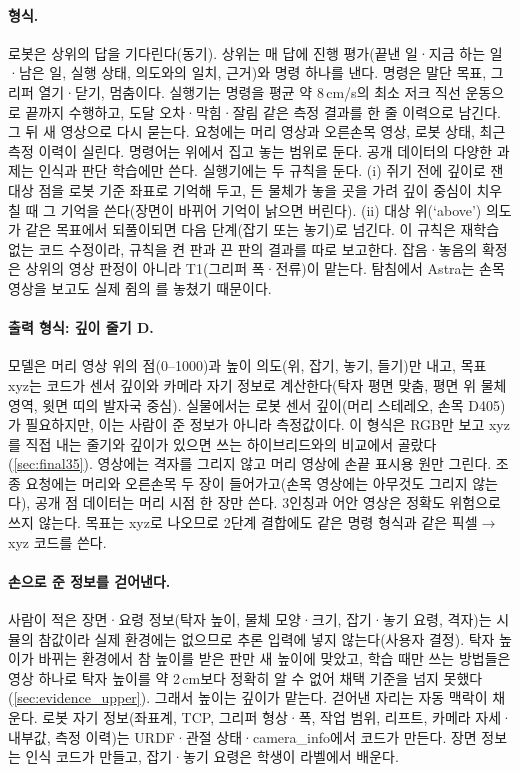 \paragraph{형식.} 로봇은 상위의 답을 기다린다(동기). 상위는 매 답에 진행 평가(끝낸 일·지금 하는 일·남은 일, 실행 상태, 의도와의 일치, 근거)와 명령 하나를 낸다. 명령은 말단 목표, 그리퍼 열기·닫기, 멈춤이다. 실행기는 명령을 평균 약 8\,cm/s의 최소 저크 직선 운동으로 끝까지 수행하고, 도달 오차·막힘·잘림 같은 측정 결과를 한 줄 이력으로 남긴다. 그 뒤 새 영상으로 다시 묻는다. 요청에는 머리 영상과 오른손목 영상, 로봇 상태, 최근 측정 이력이 실린다. 명령어는 위에서 집고 놓는 범위로 둔다. 공개 데이터의 다양한 과제는 인식과 판단 학습에만 쓴다. 실행기에는 두 규칙을 둔다. (i) 쥐기 전에 깊이로 잰 대상 점을 로봇 기준 좌표로 기억해 두고, 든 물체가 놓을 곳을 가려 깊이 중심이 치우칠 때 그 기억을 쓴다(장면이 바뀌어 기억이 낡으면 버린다). (ii) 대상 위(`above') 의도가 같은 목표에서 되풀이되면 다음 단계(잡기 또는 놓기)로 넘긴다. 이 규칙은 재학습 없는 코드 수정이라, 규칙을 켠 판과 끈 판의 결과를 따로 보고한다. 잡음·놓음의 확정은 상위의 영상 판정이 아니라 T1(그리퍼 폭·전류)이 맡는다. 탐침에서 Astra는 손목 영상을 보고도 실제 쥠의 를 놓쳤기 때문이다.

\paragraph{출력 형식: 깊이 줄기 D.} 모델은 머리 영상 위의 점(0--1000)과 높이 의도(위, 잡기, 놓기, 들기)만 내고, 목표 xyz는 코드가 센서 깊이와 카메라 자기 정보로 계산한다(탁자 평면 맞춤, 평면 위 물체 영역, 윗면 띠의 발자국 중심). 실물에서는 로봇 센서 깊이(머리 스테레오, 손목 D405)가 필요하지만, 이는 사람이 준 정보가 아니라 측정값이다. 이 형식은 RGB만 보고 xyz를 직접 내는 줄기와 깊이가 있으면 쓰는 하이브리드와의 비교에서 골랐다(\cref{sec:final35}). 영상에는 격자를 그리지 않고 머리 영상에 손끝 표시용 원만 그린다. 조종 요청에는 머리와 오른손목 두 장이 들어가고(손목 영상에는 아무것도 그리지 않는다), 공개 점 데이터는 머리 시점 한 장만 쓴다. 3인칭과 어안 영상은 정확도 위험으로 쓰지 않는다. 목표는 xyz로 나오므로 2단계 결합에도 같은 명령 형식과 같은 픽셀$\rightarrow$xyz 코드를 쓴다.

\paragraph{손으로 준 정보를 걷어낸다.} 사람이 적은 장면·요령 정보(탁자 높이, 물체 모양·크기, 잡기·놓기 요령, 격자)는 시뮬의 참값이라 실제 환경에는 없으므로 추론 입력에 넣지 않는다(사용자 결정). 탁자 높이가 바뀌는 환경에서 참 높이를 받은 판만 새 높이에 맞았고, 학습 때만 쓰는 방법들은 영상 하나로 탁자 높이를 약 2\,cm보다 정확히 알 수 없어 채택 기준을 넘지 못했다(\cref{sec:evidence_upper}). 그래서 높이는 깊이가 맡는다. 걷어낸 자리는 자동 맥락이 채운다. 로봇 자기 정보(좌표계, TCP, 그리퍼 형상·폭, 작업 범위, 리프트, 카메라 자세·내부값, 측정 이력)는 URDF·관절 상태·camera\_info에서 코드가 만든다. 장면 정보는 인식 코드가 만들고, 잡기·놓기 요령은 학생이 라벨에서 배운다.

